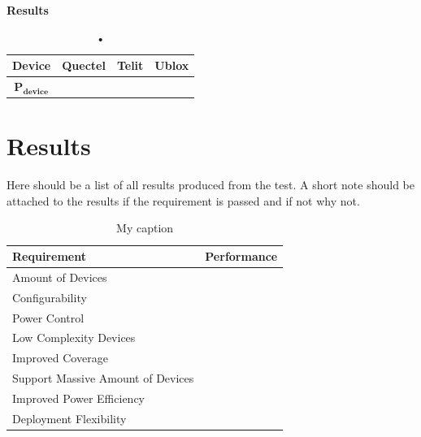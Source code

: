 \textbf{Results}\\
\begin{table}[H]
\centering
\begin{tabular}{|c|c|c|c|}\hline
\textbf{Device}	& Quectel	& Telit & Ublox \\ \hline
$\mathbf{P_{device}}$	& & & \\ \hline
\end{tabular}
\caption{•}
\label{tab:device_power_results}
\end{table}




\section{Results}
Here should be a list of all results produced from the test. A short note should be attached to the results if the requirement is passed and if not why not.

\begin{table}[H]
\centering
\begin{tabular}{|l|l|} \hline
\textbf{Requirement}              & \textbf{Performance} \\ \hline
Amount of Devices                 &                      \\ \hline
Configurability                   &                      \\ \hline
Power Control                     &                      \\ \hline
Low Complexity Devices            &                      \\ \hline
Improved Coverage                 &                      \\ \hline
Support Massive Amount of Devices &                      \\ \hline
Improved Power Efficiency         &                      \\ \hline
Deployment Flexibility            &                      \\ \hline
\end{tabular}
\caption{My caption}
\label{my-label2}
\end{table}

